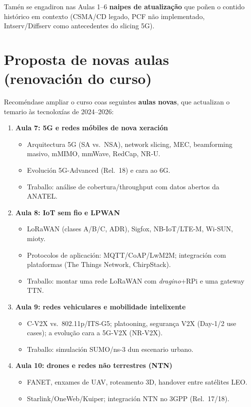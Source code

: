 \documentclass[11pt,a4paper]{article}
\begin{document}
Tamén se engadiron nas Aulas 1--6 \textbf{naipes de atualização} que poñen o
contido histórico em contexto (CSMA/CD legado, PCF não implementado, Intserv/Diffserv
como antecedentes do slicing 5G).

\section{Proposta de novas aulas (renovación do curso)}

Recoméndase ampliar o curso coas seguintes \textbf{aulas novas}, que actualizan o
temario às tecnoloxías de 2024--2026:

\begin{enumerate}
  \item \textbf{Aula 7: 5G e redes móbiles de nova xeración}
  \begin{itemize}
    \item Arquitectura 5G (SA vs.\ NSA), network slicing, MEC, beamforming masivo,
          mMIMO, mmWave, RedCap, NR-U.
    \item Evolución 5G-Advanced (Rel.\ 18) e cara ao 6G.
    \item Traballo: análise de cobertura/throughput com datos abertos da ANATEL.
  \end{itemize}

  \item \textbf{Aula 8: IoT sem fio e LPWAN}
  \begin{itemize}
    \item LoRaWAN (clases A/B/C, ADR), Sigfox, NB-IoT/LTE-M, Wi-SUN, mioty.
    \item Protocolos de aplicación: MQTT/CoAP/LwM2M; integración com plataformas
          (The Things Network, ChirpStack).
    \item Traballo: montar uma rede LoRaWAN com \emph{dragino}+RPi e uma gateway
          TTN.
  \end{itemize}

  \item \textbf{Aula 9: redes vehiculares e mobilidade intelixente}
  \begin{itemize}
    \item C-V2X vs.\ 802.11p/ITS-G5; platooning, segurança V2X (Day-1/2 use cases);
          a evolução cara a 5G-V2X (NR-V2X).
    \item Traballo: simulación SUMO/ns-3 dun escenario urbano.
  \end{itemize}

  \item \textbf{Aula 10: drones e redes não terrestres (NTN)}
  \begin{itemize}
    \item FANET, enxames de UAV, roteamento 3D, handover entre satélites LEO.
    \item Starlink/OneWeb/Kuiper; integración NTN no 3GPP (Rel.\ 17/18).
  \end{itemize}


\end{enumerate}
\end{document}
